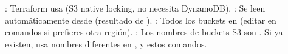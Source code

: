 \markdownRendererInterblockSeparator
{}\markdownRendererInterblockSeparator
{}\markdownRendererThematicBreak{}\markdownRendererInterblockSeparator
{}
\markdownRendererSectionEnd \markdownRendererSectionBegin
{}\markdownRendererInterblockSeparator
{}\markdownRendererUlBeginTight
\markdownRendererUlItem {}: Terraform usa  (S3 native locking, no necesita DynamoDB).\markdownRendererUlItemEnd 
\markdownRendererUlItem {}: Se leen automáticamente desde  (resultado de ).\markdownRendererUlItemEnd 
\markdownRendererUlItem {}: Todos los buckets en  (editar en comandos si prefieres otra región).\markdownRendererUlItemEnd 
\markdownRendererUlItem {}: Los nombres de buckets S3 son . Si ya existen, usa nombres diferentes en ,  y estos comandos.\markdownRendererUlItemEnd 
\markdownRendererUlEndTight 
\markdownRendererSectionEnd 
\markdownRendererSectionEnd \markdownRendererDocumentEnd